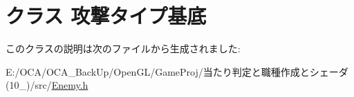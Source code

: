 \hypertarget{class_xE6_x94_xBB_xE6_x92_x83_xE3_x82_xBF_xE3_x82_xA4_xE3_x83_x97_xE5_x9F_xBA_xE5_xBA_x95}{\section{クラス 攻撃タイプ基底}
\label{class_xE6_x94_xBB_xE6_x92_x83_xE3_x82_xBF_xE3_x82_xA4_xE3_x83_x97_xE5_x9F_xBA_xE5_xBA_x95}
}


このクラスの説明は次のファイルから生成されました\-:\begin{DoxyCompactItemize}
\item 
E\-:/\-O\-C\-A/\-O\-C\-A\-\_\-\-Back\-Up/\-Open\-G\-L/\-Game\-Proj/当たり判定と職種作成とシェーダ(10\-\_)/src/\hyperlink{_enemy_8h}{Enemy.\-h}\end{DoxyCompactItemize}
